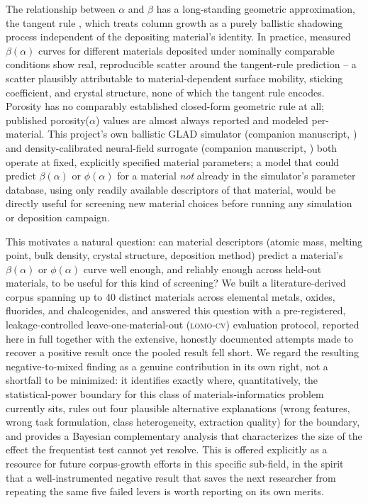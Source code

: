 \documentclass[aip,amsmath,amssymb,reprint]{revtex4-1}
\newcommand{\lomo}{\textsc{lomo-cv}}
\begin{document}
The relationship between $\alpha$ and $\beta$ has a long-standing
geometric approximation, the tangent rule
\citep{tait1993modelling,thornton1974}, which treats column growth as
a purely ballistic shadowing process independent of the depositing
material's identity. In practice, measured $\beta(\alpha)$ curves for
different materials deposited under nominally comparable conditions
show real, reproducible scatter around the tangent-rule prediction
\citep{chaffar2018,chaffar2019,tounsi2015,benamor2026,%
benNacer2020cu2oGlad} -- a scatter plausibly attributable to
material-dependent surface mobility, sticking coefficient, and
crystal structure, none of which the tangent rule encodes. Porosity
has no comparably established closed-form geometric rule at all;
published porosity($\alpha$) values are almost always reported and
modeled per-material. This project's own ballistic GLAD simulator
(companion manuscript, \citealp{companionP1}) and density-calibrated
neural-field surrogate (companion manuscript, \citealp{companionP2})
both operate at fixed, explicitly specified material parameters; a
model that could predict $\beta(\alpha)$ or $\phi(\alpha)$ for a
material \emph{not} already in the simulator's parameter database,
using only readily available descriptors of that material, would be
directly useful for screening new material choices before running any
simulation or deposition campaign.

This motivates a natural question: can material descriptors
(atomic mass, melting point, bulk density, crystal structure,
deposition method) predict a material's $\beta(\alpha)$ or
$\phi(\alpha)$ curve well enough, and reliably enough across held-out
materials, to be useful for this kind of screening? We built a
literature-derived corpus spanning up to 40 distinct materials across
elemental metals, oxides, fluorides, and chalcogenides, and answered
this question with a pre-registered, leakage-controlled
leave-one-material-out (\lomo{}) evaluation protocol, reported here in
full together with the extensive, honestly documented attempts made to
recover a positive result once the pooled result fell short. We regard
the resulting negative-to-mixed finding as a genuine contribution in
its own right, not a shortfall to be minimized: it identifies exactly
where, quantitatively, the statistical-power boundary for this class
of materials-informatics problem currently sits, rules out four
plausible alternative explanations (wrong features, wrong task
formulation, class heterogeneity, extraction quality) for the
boundary, and provides a Bayesian complementary analysis that
characterizes the size of the effect the frequentist test cannot yet
resolve. This is offered explicitly as a resource for future
corpus-growth efforts in this specific sub-field, in the spirit that a
well-instrumented negative result that saves the next researcher from
repeating the same five failed levers is worth reporting on its own
merits.
\end{document}
